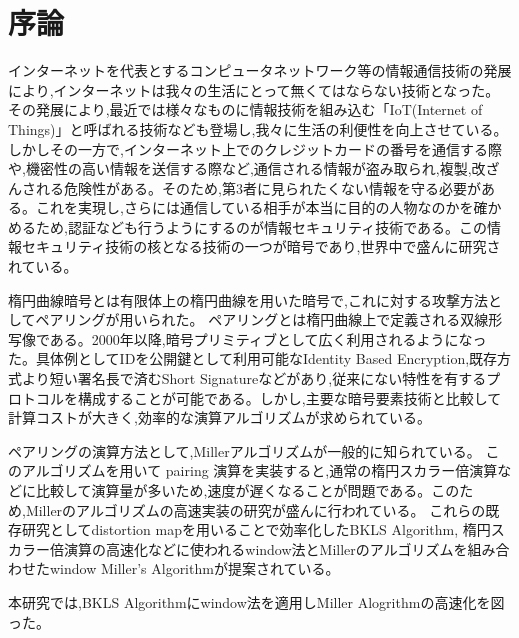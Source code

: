 \chapter{序論}
インターネットを代表とするコンピュータネットワーク等の情報通信技術の発展により,インターネットは我々の生活にとって無くてはならない技術となった。その発展により,最近では様々なものに情報技術を組み込む「IoT(Internet of Things)」と呼ばれる技術なども登場し,我々に生活の利便性を向上させている。
しかしその一方で,インターネット上でのクレジットカードの番号を通信する際や,機密性の高い情報を送信する際など,通信される情報が盗み取られ,複製,改ざんされる危険性がある。そのため,第3者に見られたくない情報を守る必要がある。これを実現し,さらには通信している相手が本当に目的の人物なのかを確かめるため,認証なども行うようにするのが情報セキュリティ技術である。この情報セキュリティ技術の核となる技術の一つが暗号であり,世界中で盛んに研究されている。

\bigskip

楕円曲線暗号とは有限体上の楕円曲線を用いた暗号で,これに対する攻撃方法としてペアリングが用いられた。
ペアリングとは楕円曲線上で定義される双線形写像である。2000年以降,暗号プリミティブとして広く利用されるようになった。具体例としてIDを公開鍵として利用可能なIdentity Based Encryption,既存方式より短い署名長で済むShort Signatureなどがあり,従来にない特性を有するプロトコルを構成することが可能である。しかし,主要な暗号要素技術と比較して計算コストが大きく,効率的な演算アルゴリズムが求められている。

\bigskip

ペアリングの演算方法として,Millerアルゴリズムが一般的に知られている。
このアルゴリズムを用いて pairing 演算を実装すると,通常の楕円スカラー倍演算などに比較して演算量が多いため,速度が遅くなることが問題である。このため,Millerのアルゴリズムの高速実装の研究が盛んに行われている。
これらの既存研究としてdistortion mapを用いることで効率化したBKLS Algorithm, 楕円スカラー倍演算の高速化などに使われるwindow法とMillerのアルゴリズムを組み合わせたwindow Miller's Algorithmが提案されている。

本研究では,BKLS Algorithmにwindow法を適用しMiller Alogrithmの高速化を図った。

\bigskip

\par
